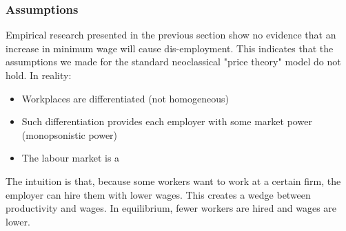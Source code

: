         \subsubsection{Assumptions}
            Empirical research presented in the previous section show no evidence that an increase in minimum wage will cause dis-employment. This indicates that the assumptions we made for the standard neoclassical "price theory" model do not hold. In reality:
            \begin{itemize}
                \item Workplaces are differentiated (not homogeneous)
                \item Such differentiation provides each employer with some market power (monopsonistic power)
                \item The labour market is a 
            \end{itemize}
            The intuition is that, because some workers want to work at a certain firm, the employer can hire them with lower wages. This creates a wedge between productivity and wages. In equilibrium, fewer workers are hired and wages are lower.
            
